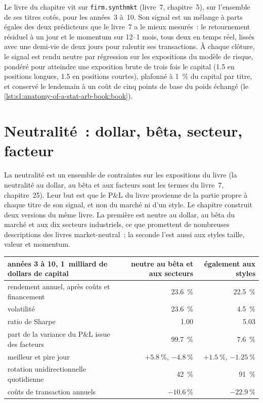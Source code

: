 Le livre du chapitre vit sur \texttt{firm.synthmkt} (livre~7, chapitre~5), sur l'ensemble de ses titres cotés, pour les années~3 à~10. Son signal est un mélange à parts égales des deux
prédicteurs que le livre~7 a le mieux mesurés~: le retournement résiduel à un jour et le momentum sur 12--1 mois, tous deux en temps réel, lissés avec une demi-vie de deux jours pour ralentir
ses transactions. À chaque clôture, le signal est rendu neutre par régression sur les expositions du modèle de risque, pondéré pour atteindre une exposition brute de trois fois le capital (1.5
en positions longues, 1.5 en positions courtes), plafonné à 1~\% du capital par titre, et conservé le lendemain à un coût de cinq points de base du poids échangé (le \cref{lst:s1:anatomy-of-a-stat-arb-book:book}).

\section{Neutralité~: dollar, bêta, secteur, facteur}

La neutralité est un ensemble de contraintes sur les expositions du livre (la neutralité au dollar, au bêta et aux facteurs sont les termes du livre~7, chapitre~25). Leur but est que le
P\&L du livre provienne de la partie propre à chaque titre de son signal, et non du marché ni d'un style. Le chapitre construit deux versions du même livre. La première est
neutre au dollar, au bêta du marché et aux dix secteurs industriels, ce que promettent de nombreuses descriptions des livres market-neutral~; la seconde l'est aussi aux
styles taille, valeur et momentum.

\begin{center}
\small
\begin{tabular}{@{}lrr@{}}
\toprule
années 3 à 10, 1~milliard de dollars de capital & neutre au bêta et aux secteurs & également aux styles\\
\midrule
rendement annuel, après coûts et financement & 23.6~\% & 22.5~\%\\
volatilité & 23.6~\% & 4.5~\%\\
ratio de Sharpe & 1.00 & 5.03\\
part de la variance du P\&L issue des facteurs & 99.7~\% & 7.6~\%\\
meilleur et pire jour & $+5.8~\%$, $-4.8~\%$ & $+1.5~\%$, $-1.25~\%$\\
rotation unidirectionnelle quotidienne & 42~\% & 91~\%\\
coûts de transaction annuels & $-10.6~\%$ & $-22.9~\%$\\
\bottomrule
\end{tabular}
\end{center}

